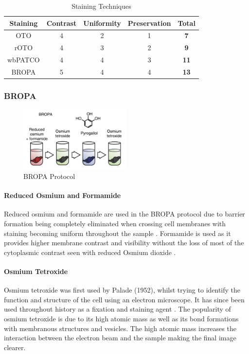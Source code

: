 \documentclass[a4paper, 11pt]{article}
\numberwithin{equation}{section}
\begin{document}
\begin{table}[H]
\centering

\begin{tabular}{|c|c|c|c|c|}
\hline
\textbf{Staining} & \textbf{Contrast} & \textbf{Uniformity} & \textbf{Preservation} & \textbf{Total} \\ \hline
OTO & 4 & 2 & 1 & \textbf{7} \\ \hline
rOTO & 4 & 3 & 2 & \textbf{9} \\ \hline
\multicolumn{1}{|l|}{wbPATCO} & 4 & 4 & 3 & \textbf{11} \\ \hline
BROPA & 5 & 4 & 4 & \textbf{13} \\ \hline
\end{tabular}
\caption{Staining Techniques}
\label{stainingtechiques}
\end{table}

\subsubsection{BROPA}

\begin{figure}[H]
\centering
\includegraphics[width=0.50\textwidth]{bropa.png}
\caption{\label{fig:BROPA} BROPA Protocol \cite{wholemousebrain2012}}
\end{figure}	



\paragraph{Reduced Osmium and Formamide}

Reduced osmium and formamide are used in the BROPA protocol due to barrier formation being completely eliminated when crossing cell membranes with staining becoming uniform throughout the sample \cite{highres_em_staining}. Formamide is used as it provides higher membrane contrast and visibility without the loss of most of the cytoplasmic contrast seen with reduced Osmium dioxide \cite{OTOvsrOTO}.


\paragraph{Osmium Tetroxide}
Osmium tetroxide was first used by Palade (1952), whilst trying to identify the function and structure of the cell using an electron microscope. It has since been used throughout history as a fixation and staining agent \cite{OsmiumTetroxidemethod}. The popularity of osmium tetroxide is due to its high atomic mass as well as its bond formations with membranous structures and vesicles. The high atomic mass increases the interaction between the electron beam and the sample making the final image clearer. 
\end{document}
